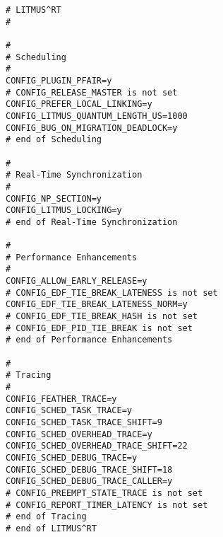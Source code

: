 \begin{lstlisting}[style=config, caption=Partie du fichier .config liée a \litmus]
# LITMUS^RT
#

#
# Scheduling
#
CONFIG_PLUGIN_PFAIR=y
# CONFIG_RELEASE_MASTER is not set
CONFIG_PREFER_LOCAL_LINKING=y
CONFIG_LITMUS_QUANTUM_LENGTH_US=1000
CONFIG_BUG_ON_MIGRATION_DEADLOCK=y
# end of Scheduling

#
# Real-Time Synchronization
#
CONFIG_NP_SECTION=y
CONFIG_LITMUS_LOCKING=y
# end of Real-Time Synchronization

#
# Performance Enhancements
#
CONFIG_ALLOW_EARLY_RELEASE=y
# CONFIG_EDF_TIE_BREAK_LATENESS is not set
CONFIG_EDF_TIE_BREAK_LATENESS_NORM=y
# CONFIG_EDF_TIE_BREAK_HASH is not set
# CONFIG_EDF_PID_TIE_BREAK is not set
# end of Performance Enhancements

#
# Tracing
#
CONFIG_FEATHER_TRACE=y
CONFIG_SCHED_TASK_TRACE=y
CONFIG_SCHED_TASK_TRACE_SHIFT=9
CONFIG_SCHED_OVERHEAD_TRACE=y
CONFIG_SCHED_OVERHEAD_TRACE_SHIFT=22
CONFIG_SCHED_DEBUG_TRACE=y
CONFIG_SCHED_DEBUG_TRACE_SHIFT=18
CONFIG_SCHED_DEBUG_TRACE_CALLER=y
# CONFIG_PREEMPT_STATE_TRACE is not set
# CONFIG_REPORT_TIMER_LATENCY is not set
# end of Tracing
# end of LITMUS^RT
\end{lstlisting}

\newpage

